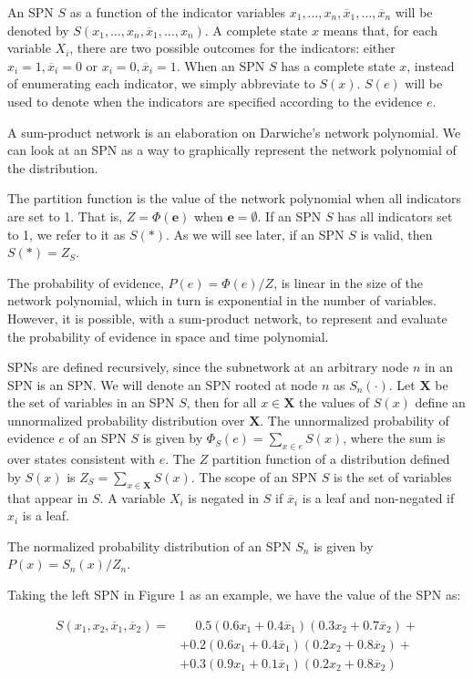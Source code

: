 \documentclass[a4paper,10pt]{article}
\theoremstyle{plain}
\begin{document}
An SPN $S$ as a function of the indicator variables $x_1,\ldots,x_n,\overline{x}_1,\ldots,
\overline{x}_n$ will be denoted by $S(x_1,\ldots,x_n,\overline{x}_1,\ldots,x_n)$. A complete state
$x$ means that, for each variable $X_i$, there are two possible outcomes for the indicators: either
$x_i=1,\overline{x}_i=0$ or $x_i=0,\overline{x}_i=1$. When an SPN $S$ has a complete state $x$,
instead of enumerating each indicator, we simply abbreviate to $S(x)$. $S(e)$ will be used to
denote when the indicators are specified according to the evidence $e$.

A sum-product network is an elaboration on Darwiche's network polynomial. We can look at an SPN as
a way to graphically represent the network polynomial of the distribution.

The partition function is the value of the network polynomial when all indicators are set to 1.
That is, $Z=\Phi(\mathbf{e})$ when $\mathbf{e}=\emptyset$. If an SPN $S$ has all indicators set to
1, we refer to it as $S(*)$. As we will see later, if an SPN $S$ is valid, then $S(*)=Z_S$.

The probability of evidence, $P(e)=\Phi(e)/Z$, is linear in the size of the network polynomial,
which in turn is exponential in the number of variables. However, it is possible, with a
sum-product network, to represent and evaluate the probability of evidence in space and time
polynomial.

SPNs are defined recursively, since the subnetwork at an arbitrary node $n$ in an SPN is an SPN\@.
We will denote an SPN rooted at node $n$ as $S_n(\cdot)$. Let $\mathbf{X}$ be the set of variables
in an SPN $S$, then for all $x\in \mathbf{X}$ the values of $S(x)$ define an unnormalized
probability distribution over $\mathbf{X}$. The unnormalized probability of evidence $e$ of an SPN
$S$ is given by $\Phi_S(e)=\sum_{x\in e}S(x)$, where the sum is over states consistent with $e$.
The $Z$ partition function of a distribution defined by $S(x)$ is $Z_S=\sum_{x\in \mathbf{X}}S(x)$.
The scope of an SPN $S$ is the set of variables that appear in $S$. A variable $X_i$ is negated in
$S$ if $\overline{x}_i$ is a leaf and non-negated if $x_i$ is a leaf.

The normalized probability distribution of an SPN $S_n$ is given by $P(x)=S_n(x)/Z_n$.

Taking the left SPN in Figure 1 as an example, we have the value of the SPN as:

\begin{align*}
  S(x_1,x_2,\overline{x}_1,\overline{x}_2)=&\phantom{{} +{}}0.5(0.6x_1+0.4\overline{x}_1)(0.3x_2+0.7\overline{x}_2)+\\
                                           &+0.2(0.6x_1+0.4\overline{x}_1)(0.2x_2+0.8\overline{x}_2)+\\
                                           &+0.3(0.9x_1+0.1\overline{x}_1)(0.2x_2+0.8\overline{x}_2)
\end{align*}
\end{document}
